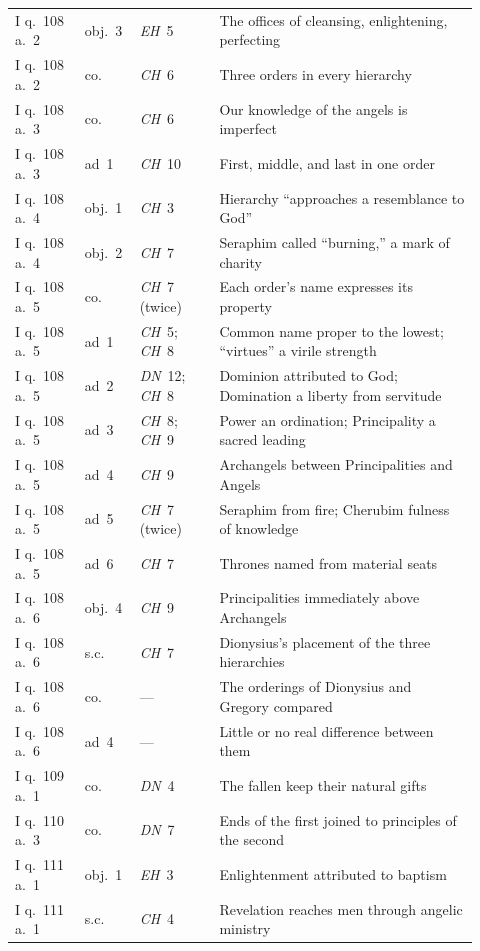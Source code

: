 {\begin{longtable}{@{}>{\raggedright\arraybackslash}p{0.14\linewidth}>{\raggedright\arraybackslash}p{0.10\linewidth}>{\raggedright\arraybackslash}p{0.16\linewidth}>{\raggedright\arraybackslash}p{0.52\linewidth}@{}}
I q.~108 a.~2 & obj.~3 & \emph{EH}~5 & The offices of cleansing, enlightening, perfecting \\
I q.~108 a.~2 & co. & \emph{CH}~6 & Three orders in every hierarchy \\
I q.~108 a.~3 & co. & \emph{CH}~6 & Our knowledge of the angels is imperfect \\
I q.~108 a.~3 & ad~1 & \emph{CH}~10 & First, middle, and last in one order \\
I q.~108 a.~4 & obj.~1 & \emph{CH}~3 & Hierarchy ``approaches a resemblance to God'' \\
I q.~108 a.~4 & obj.~2 & \emph{CH}~7 & Seraphim called ``burning,'' a mark of charity \\
I q.~108 a.~5 & co. & \emph{CH}~7 (twice) & Each order's name expresses its property \\
I q.~108 a.~5 & ad~1 & \emph{CH}~5; \emph{CH}~8 & Common name proper to the lowest; ``virtues'' a virile strength \\
I q.~108 a.~5 & ad~2 & \emph{DN}~12; \emph{CH}~8 & Dominion attributed to God; Domination a liberty from servitude \\
I q.~108 a.~5 & ad~3 & \emph{CH}~8; \emph{CH}~9 & Power an ordination; Principality a sacred leading \\
I q.~108 a.~5 & ad~4 & \emph{CH}~9 & Archangels between Principalities and Angels \\
I q.~108 a.~5 & ad~5 & \emph{CH}~7 (twice) & Seraphim from fire; Cherubim fulness of knowledge \\
I q.~108 a.~5 & ad~6 & \emph{CH}~7 & Thrones named from material seats \\
I q.~108 a.~6 & obj.~4 & \emph{CH}~9 & Principalities immediately above Archangels \\
I q.~108 a.~6 & s.c. & \emph{CH}~7 & Dionysius's placement of the three hierarchies \\
I q.~108 a.~6 & co. & --- & The orderings of Dionysius and Gregory compared \\
I q.~108 a.~6 & ad~4 & --- & Little or no real difference between them \\
I q.~109 a.~1 & co. & \emph{DN}~4 & The fallen keep their natural gifts \\
I q.~110 a.~3 & co. & \emph{DN}~7 & Ends of the first joined to principles of the second \\
I q.~111 a.~1 & obj.~1 & \emph{EH}~3 & Enlightenment attributed to baptism \\
I q.~111 a.~1 & s.c. & \emph{CH}~4 & Revelation reaches men through angelic ministry \\

\end{longtable}}

